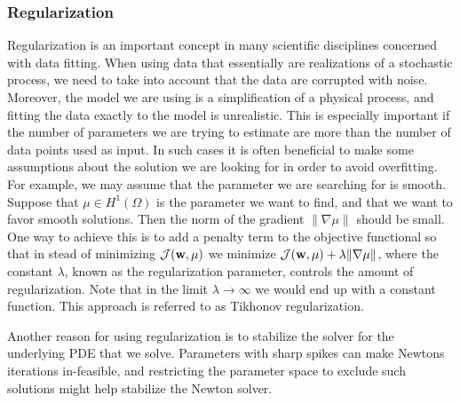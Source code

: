\subsubsection{Regularization}
Regularization is an important concept in many scientific disciplines
concerned with data fitting. When using data that essentially are
realizations of a stochastic process, we need to take into account
that the data are corrupted with noise. Moreover, the model we are using
is a simplification of a physical process, and fitting the
data exactly to the model is unrealistic. This is especially
important if the number of parameters we are trying to estimate are
more than the number of data points used as input. In such cases it is often
beneficial to make some assumptions about the solution we are looking
for in order to avoid overfitting. For example, we may assume that the
parameter we are searching for is smooth. Suppose that $\mu \in
H^1(\Omega)$ is the parameter we want to find, and that we want to
favor smooth solutions. Then the norm of the gradient $\| \nabla \mu
\|$ should be small. One way to achieve this is to add a penalty term
to the objective functional so that in stead of minimizing
$\mathcal{J}(\mathbf{w}, \mu)$ we minimize $\mathcal{J}(\mathbf{w}, \mu) +
\lambda \| \nabla \mu\|$, where the constant $\lambda$, known as the
regularization parameter, controls the amount of regularization.
Note that in the limit $\lambda \rightarrow \infty$ we would end up
with a constant function. This approach is referred to as Tikhonov
regularization.

Another reason for using regularization is to stabilize the solver for
the underlying PDE that we solve. Parameters with sharp spikes
can make Newtons iterations in-feasible, and restricting the
parameter space to exclude such solutions might help stabilize the
Newton solver. 






